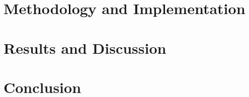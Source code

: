 \documentclass[12pt,a4paper]{report}
\begin{document}
\newpage
\chapter{Methodology and Implementation}

\newpage

\newpage


\newpage
\chapter{Results and Discussion}


\newpage
\chapter{Conclusion}


%

\newpage


\newpage







\newpage
\shipout\null
\shipout\null
\end{document}
